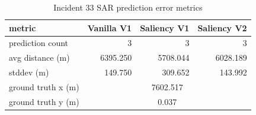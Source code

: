 \begin{table}[ht]
\centering
\caption{Incident 33 SAR prediction error metrics}
\label{tab:sar-incident-33}
\begin{tabular}{lrrr}
\hline
metric & Vanilla V1 & Saliency V1 & Saliency V2 \\
\hline
prediction count & 3 & 3 & 3 \\
avg distance (m) & 6395.250 & 5708.044 & 6028.189 \\
stddev (m) & 149.750 & 309.652 & 143.992 \\
ground truth x (m) & \multicolumn{3}{c}{7602.517} \\
ground truth y (m) & \multicolumn{3}{c}{0.037} \\
\hline
\end{tabular}
\end{table}
